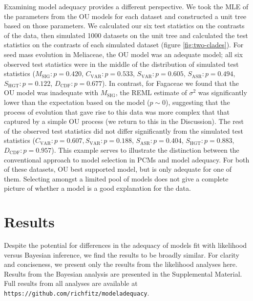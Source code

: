 \documentclass[a4paper,11pt]{article}
\begin{document}
Examining model adequacy provides a different perspective. We took the MLE of the parameters from the OU models for each dataset and constructed a unit tree based on those parameters. We calculated our six test statistics on the contrasts of the data, then simulated 1000 datasets on the unit tree and calculated the test statistics on the contrasts of each simulated dataset (figure \ref{fig:two-clades}). For seed mass evolution in Meliaceae, the OU model was an adequate model; all six observed test statistics were in the middle of the distribution of simulated test statistics ($M_{\text{SIG}}: p=0.420$, $C_{\text{VAR}}: p=0.533$, $S_{\text{VAR}}: p=0.605$, $S_{\text{ASR}}:p=0.494$, $S_{\text{HGT}}: p=0.122$, $D_{\text{CDF}}: p=0.677$). In contrast, for Fagaceae we found that the OU model was inadequate with $M_{\text{SIG}}$, the REML estimate of $\sigma^2$ was significantly lower than the expectation based on the model ($p\sim 0$), suggesting that the process of evolution that gave rise to this data was more complex that that captured by a simple OU process (we return to this in the Discussion).  The rest of the observed test statistics did not differ significantly from the simulated test statistics ($C_{\text{VAR}}:p=0.607, S_{\text{VAR}}: p=0.188$, $S_{\text{ASR}}:p=0.404$, $S_{\text{HGT}}: p=0.883$, $D_{\text{CDF}}: p=0.957$). This example serves to illustrate the distinction between the conventional approach to model selection in PCMs and model adequacy. For both of these datasets, OU best supported model, but is only adequate for one of them. Selecting amongst a limited pool of models does not give a complete picture of whether a model is a good explanation for the data.


\section{Results}

Despite the potential for differences in the adequacy of models fit with likelihood versus Bayesian inference, we find the results to be broadly similar. For clarity and conciseness, we present only the results from the likelihood analyses here. Results from the Bayesian analysis are presented in the Supplemental Material. Full results from all analyses are available at \texttt{https://github.com/richfitz/modeladequacy}. 
\end{document}
